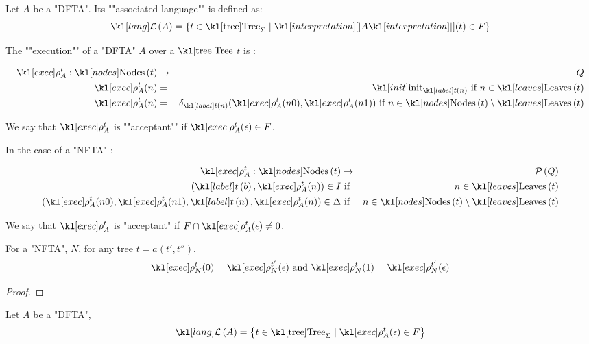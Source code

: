 \documentclass{article}
\begin{document}
\begin{definition}
	Let $A$ be a "DFTA". Its ""associated language"" is defined as:
	$$\lang A = \setdef {t \in \tree_{\Sigma}} {\interpret A (t) \in F}$$
\end{definition}


\begin{definition}
	The ""execution"" of a "DFTA" $A$ over a $\tree$ $t$ is :

	\begin{eqnarray*}
		\exec A t : \nodes t &\to & Q \\
		\exec A t (n)  &=& \init_{\tlabel t n} \text{ if } n \in \leaves t \\
		\exec A t (n)  &=& \delta_{\tlabel t n}(\exec A t (n0), \exec A t (n1)) \text{ if } n \in \nodes t \setminus \leaves t
	\end{eqnarray*}

	We say that $\exec A t$ is ""acceptant"" if $\exec A t (\epsilon) \in F$.

	In the case of a "NFTA" :

	\begin{eqnarray*}
		\exec A t : \nodes t &\to& \parts Q \\
		(\tlabel t b,  \exec A t (n)) \in I &\text{ if }& n \in \leaves t \\
		(\exec A t (n0), \exec A t (n1), \tlabel t n, \exec A t (n)) \in \Delta &\text{ if }& n \in \nodes t \setminus \leaves t
	\end{eqnarray*}

	We say that $\exec A t$ is "acceptant" if $F \cap \exec A t (\epsilon) \neq 0$.

\end{definition}

\begin{lemma}
	For a "NFTA", $N$, for any tree $t = a(t',t'')$,
	$$\exec N t (0) = \exec N {t'} (\epsilon) \text{ and } \exec N t (1) = \exec N {t'} (\epsilon)$$
\end{lemma}

\begin{proof}
	\todo{}
\end{proof}


\begin{lemma}
	Let $A$ be a "DFTA",
	$$ \lang A = \setdef {t \in \tree_{\Sigma}} {\exec A t (\epsilon) \in F} $$
\end{lemma}
\end{document}
